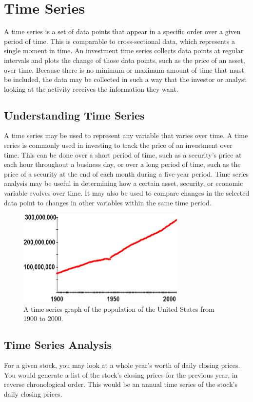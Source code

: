 \chapter{Time Series}

A time series is a set of data points that appear in a specific order over a given period of time. This is comparable to cross-sectional data, which represents a single moment in time. An investment time series collects data points at regular intervals and plots the change of those data points, such as the price of an asset, over time. Because there is no minimum or maximum amount of time that must be included, the data may be collected in such a way that the investor or analyst looking at the activity receives the information they want.

\section{Understanding Time Series} %
\label{sec:intro_sum_results} %
A time series may be used to represent any variable that varies over time. A time series is commonly used in investing to track the price of an investment over time. This can be done over a short period of time, such as a security's price at each hour throughout a business day, or over a long period of time, such as the price of a security at the end of each month during a five-year period.
Time series analysis may be useful in determining how a certain asset, security, or economic variable evolves over time. It may also be used to compare changes in the selected data point to changes in other variables within the same time period.

\begin{figure}[ht]
    \centering
    \includegraphics[scale=1.0]{figures/TimeSeries.png}
    \caption{A time series graph of the population of the United States from 1900 to 2000.}
    \label{fig:chart_a}
\end{figure}

\section{Time Series Analysis} %
\label{sec:intro_sum_results} %
For a given stock, you may look at a whole year's worth of daily closing prices. You would generate a list of the stock's closing prices for the previous year, in reverse chronological order. This would be an annual time series of the stock's daily closing prices.

